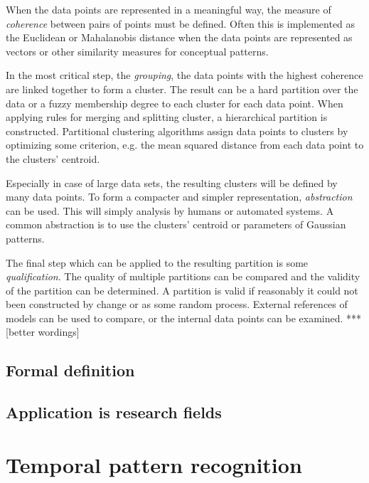 When the data points are represented in a meaningful way, the measure of 
\emph{coherence} between pairs of points must be defined. Often this is 
implemented as the Euclidean 
or Mahalanobis distance when the data points are represented as vectors or 
other similarity measures for conceptual patterns.

In the most critical step, the \emph{grouping}, the data points with the 
highest coherence are linked together to form a cluster. The result can be a 
hard partition over the data or a fuzzy membership degree to each cluster for 
each data point. When applying rules for merging and splitting cluster, a 
hierarchical partition is constructed. Partitional clustering algorithms 
assign data points to clusters by optimizing some criterion, e.g. the mean 
squared distance from each data point to the clusters' centroid.

Especially in case of large data sets, the resulting clusters will be defined 
by many data points. To form a compacter and simpler representation, 
\emph{abstraction} can be used. This will simply analysis by humans or 
automated systems. A common abstraction is to use the clusters' centroid 
\cite{diday1976clustering} or parameters of Gaussian patterns.

The final step which can be applied to the resulting partition is some 
\emph{qualification}. The quality of multiple partitions can be compared and 
the validity of the partition can be determined. A partition is valid if 
reasonably it could not been constructed by change or as some random process. 
External references of models can be used to compare, or the internal data 
points can be examined. *** [better wordings]



\subsection{Formal definition}






\subsection{Application is research fields}



\section{Temporal pattern recognition}


